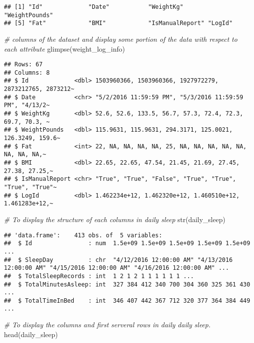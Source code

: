 \documentclass[
]{article}
\newenvironment{Shaded}{\begin{snugshade}}{\end{snugshade}}
\newcommand{\CommentTok}[1]{\textcolor[rgb]{0.56,0.35,0.01}{\textit{#1}}}
\newcommand{\FunctionTok}[1]{\textcolor[rgb]{0.00,0.00,0.00}{#1}}
\newcommand{\NormalTok}[1]{#1}
\begin{document}
\begin{verbatim}
## [1] "Id"             "Date"           "WeightKg"       "WeightPounds"  
## [5] "Fat"            "BMI"            "IsManualReport" "LogId"
\end{verbatim}

\begin{Shaded}
\begin{Highlighting}[]
\CommentTok{\# columns of the dataset and display some portion of the data with respect to each attribute}
\FunctionTok{glimpse}\NormalTok{(weight\_log\_info)}
\end{Highlighting}
\end{Shaded}

\begin{verbatim}
## Rows: 67
## Columns: 8
## $ Id             <dbl> 1503960366, 1503960366, 1927972279, 2873212765, 2873212~
## $ Date           <chr> "5/2/2016 11:59:59 PM", "5/3/2016 11:59:59 PM", "4/13/2~
## $ WeightKg       <dbl> 52.6, 52.6, 133.5, 56.7, 57.3, 72.4, 72.3, 69.7, 70.3, ~
## $ WeightPounds   <dbl> 115.9631, 115.9631, 294.3171, 125.0021, 126.3249, 159.6~
## $ Fat            <int> 22, NA, NA, NA, NA, 25, NA, NA, NA, NA, NA, NA, NA, NA,~
## $ BMI            <dbl> 22.65, 22.65, 47.54, 21.45, 21.69, 27.45, 27.38, 27.25,~
## $ IsManualReport <chr> "True", "True", "False", "True", "True", "True", "True"~
## $ LogId          <dbl> 1.462234e+12, 1.462320e+12, 1.460510e+12, 1.461283e+12,~
\end{verbatim}

\begin{Shaded}
\begin{Highlighting}[]
\CommentTok{\# To display the structure of each columns in daily sleep}
\FunctionTok{str}\NormalTok{(daily\_sleep)}
\end{Highlighting}
\end{Shaded}

\begin{verbatim}
## 'data.frame':    413 obs. of  5 variables:
##  $ Id                : num  1.5e+09 1.5e+09 1.5e+09 1.5e+09 1.5e+09 ...
##  $ SleepDay          : chr  "4/12/2016 12:00:00 AM" "4/13/2016 12:00:00 AM" "4/15/2016 12:00:00 AM" "4/16/2016 12:00:00 AM" ...
##  $ TotalSleepRecords : int  1 2 1 2 1 1 1 1 1 1 ...
##  $ TotalMinutesAsleep: int  327 384 412 340 700 304 360 325 361 430 ...
##  $ TotalTimeInBed    : int  346 407 442 367 712 320 377 364 384 449 ...
\end{verbatim}

\begin{Shaded}
\begin{Highlighting}[]
\CommentTok{\# To display the columns and first serveral rows in daily daily sleep.}
\FunctionTok{head}\NormalTok{(daily\_sleep)}
\end{Highlighting}
\end{Shaded}
\end{document}
